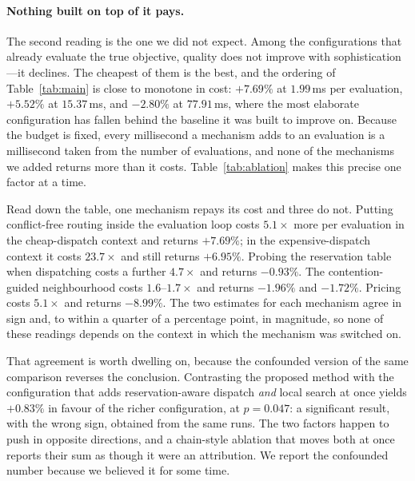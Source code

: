 \documentclass[manuscript,screen,review]{acmart}
\begin{document}
\paragraph{Nothing built on top of it pays.}
The second reading is the one we did not expect. Among the configurations that
already evaluate the true objective, quality does not improve with
sophistication---it declines. The cheapest of them is the best, and the ordering
of Table~\ref{tab:main} is close to monotone in cost: $+7.69\%$ at
$1.99$\,ms per evaluation, $+5.52\%$ at $15.37$\,ms, and $-2.80\%$ at
$77.91$\,ms, where the most elaborate configuration has fallen behind the
baseline it was built to improve on. Because the budget is fixed, every
millisecond a mechanism adds to an evaluation is a millisecond taken from the
number of evaluations, and none of the mechanisms we added returns more than it
costs. Table~\ref{tab:ablation} makes this precise one factor at a time.

\begin{table}[t]
\caption{Attribution of each mechanism, from pairs of configurations differing
in that mechanism alone. Positive means the mechanism repays its cost under an
equal wall-clock budget. ``Cost'' is the resulting multiple in ms per
evaluation. Each mechanism is switched on in two contexts; agreement between
the two rows is what makes the estimate trustworthy.}
\label{tab:ablation}
\small

\end{table}

Read down the table, one mechanism repays its cost and three do not. Putting
conflict-free routing inside the evaluation loop costs $5.1\times$ more per
evaluation in the cheap-dispatch context and returns $+7.69\%$; in the
expensive-dispatch context it costs $23.7\times$ and still returns $+6.95\%$.
Probing the reservation table when dispatching costs a further $4.7\times$ and
returns $-0.93\%$. The contention-guided neighbourhood costs $1.6$--$1.7\times$
and returns $-1.96\%$ and $-1.72\%$. Pricing costs $5.1\times$ and returns
$-8.99\%$. The two estimates for each mechanism agree in sign and, to within a
quarter of a percentage point, in magnitude, so none of these readings depends
on the context in which the mechanism was switched on.

That agreement is worth dwelling on, because the confounded version of the same
comparison reverses the conclusion. Contrasting the proposed method with the
configuration that adds reservation-aware dispatch \emph{and} local search at
once yields $+0.83\%$ in favour of the richer configuration, at $p=0.047$: a
significant result, with the wrong sign, obtained from the same runs. The two
factors happen to push in opposite directions, and a chain-style ablation that
moves both at once reports their sum as though it were an attribution. We report
the confounded number because we believed it for some time.
\end{document}
